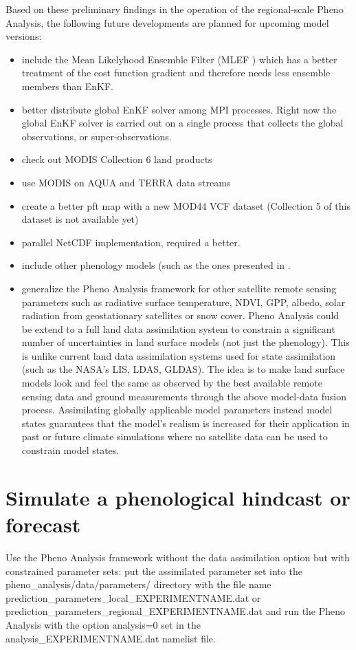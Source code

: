 \documentclass[a4paper,12pt]{article}
\begin{document}
Based on these preliminary findings in the operation of the regional-scale Pheno Analysis, the following future developments are planned for upcoming model versions:
\begin{itemize}
\item include the Mean Likelyhood Ensemble Filter (MLEF \citep{Zupanski2005, Albayrak2007}) which has a better treatment of the cost function gradient and therefore needs less ensemble members than EnKF.
\item better distribute global EnKF solver among MPI processes. Right now the global EnKF solver is carried out on a single process that collects the global observations, or super-observations.
\item check out MODIS Collection 6 land products
\item use MODIS on AQUA and TERRA data streams
\item create a better pft map with a new MOD44 VCF dataset (Collection 5 of this dataset is not available yet)
\item parallel NetCDF implementation, required a better.
\item include other phenology models (such as the ones presented in \cite{Stockli2008}.
\item generalize the Pheno Analysis framework for other satellite remote sensing parameters such as radiative surface temperature, NDVI, GPP, albedo, solar radiation from geostationary satellites or snow cover. Pheno Analysis could be extend to a full land data assimilation system to constrain a significant number of uncertainties in land surface models (not just the phenology). This is unlike current land data assimilation systems used for state assimilation (such as the NASA's LIS, LDAS, GLDAS). The idea is to make land surface models look and feel the same as observed by the best available remote sensing data and ground measurements through the above model-data fusion process. Assimilating globally applicable model parameters instead model states guarantees that the model's realism is increased for their application in past or future climate simulations where no satellite data can be used to constrain model states.
\end{itemize}

\section{Simulate a phenological hindcast or forecast}
Use the Pheno Analysis framework without the data assimilation option but with constrained parameter sets: put the assimilated parameter set into the pheno\_analysis/data/parameters/ directory with the file name prediction\_parameters\_local\_EXPERIMENTNAME.dat or prediction\_parameters\_regional\_EXPERIMENTNAME.dat and run the Pheno Analysis with the option analysis=0 set in the analysis\_EXPERIMENTNAME.dat namelist file.
\end{document}
